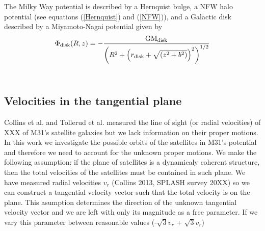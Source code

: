 \documentclass[useAMS,usenatbib]{mn2e}
\begin{document}
The Milky Way potential is described by a Hernquist bulge, a NFW halo potential (see equations (\ref{Hernquist}) and (\ref{NFW})), 
and a Galactic disk described by a Miyamoto-Nagai potential \citep{1975PASJ...27..533M} given by
\begin{equation}
\Phi_{\rm{disk}}(R,z)=-\frac{\rm{GM_{disk}}}{\left(R^2+\left(r_{\rm{disk}}+{\sqrt{(z^2+b^2)}}\right)^2\right)^{1/2}}
\end{equation}\\


\subsection{Velocities in the tangential plane}
Collins et al. and Tollerud et al. measured the line of sight (or radial velocities) of XXX of M31's satellite galaxies but we lack information on their proper motions.  
In this work we investigate the possible orbits of the satellites in M31's potential and therefore we need to account for the unknown proper motions. 
We make the following assumption: if the plane of satellites is a
dynamicaly coherent structure, then the total velocities of the
satellites must be contained in such plane. We have measured radial
velocities $v_r$ (Collins 2013, SPLASH survey 20XX) so we can construct a
tangential velocity vector such that the total velocity is on the
plane. This asumption determines the direction of the unknown tangential
velocity vector and we are left with only its magnitude as a free
parameter. If we vary this parameter between reasonable values
(-$\sqrt 3 v_r$ + $\sqrt 3 v_r$) 
\end{document}
